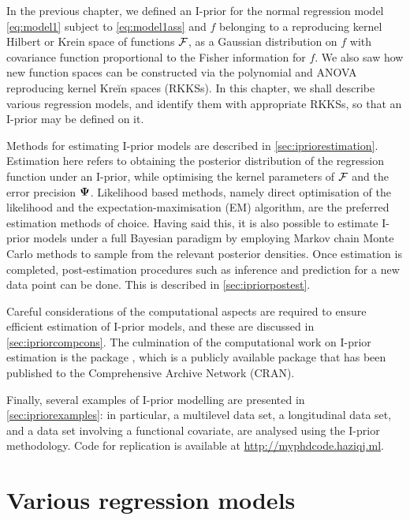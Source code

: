 \documentclass[showframe,11pt]{report}
\begin{document}
\label{chapter4}

In the previous chapter, we defined an I-prior for the normal regression model \cref{eq:model1} subject to \cref{eq:model1ass} and $f$ belonging to a reproducing kernel Hilbert or Krein space of functions ${\mathcal F}$, as a Gaussian distribution on $f$ with covariance function proportional to the Fisher information for $f$.
We also saw how new function spaces can be constructed via the polynomial and ANOVA reproducing kernel Kreĭn spaces (RKKSs).
In this chapter, we shall describe various regression models, and identify them with appropriate RKKSs, so that an I-prior may be defined on it.

Methods for estimating I-prior models are described in \cref{sec:ipriorestimation}.
Estimation here refers to obtaining the posterior distribution of the regression function under an I-prior, while optimising the kernel parameters of ${\mathcal F}$ and the error precision ${\bm\Psi}$.
Likelihood based methods, namely direct optimisation of the likelihood and the expectation-maximisation (EM) algorithm, are the preferred estimation methods of choice.
Having said this, it is also possible to estimate I-prior models under a full Bayesian paradigm by employing Markov chain Monte Carlo methods to sample from the relevant posterior densities.
Once estimation is completed, post-estimation procedures such as inference and prediction for a new data point can be done.
This is described in \cref{sec:ipriorpostest}.

Careful considerations of the computational aspects are required to ensure efficient estimation of I-prior models, and these are discussed in \cref{sec:ipriorcompcons}.
The culmination of the computational work on I-prior estimation is the  package \citep{jamil2017iprior}, which is a publicly available  package that has been published to the Comprehensive  Archive Network (CRAN).

Finally, several examples of I-prior modelling are presented in  \cref{sec:ipriorexamples}: in particular, a multilevel data set, a longitudinal data set, and a data set involving a functional covariate, are analysed using the I-prior methodology.
Code for replication is available at \url{http://myphdcode.haziqj.ml}.

\section{Various regression models}
\label{sec:various-regression}

\end{document}
